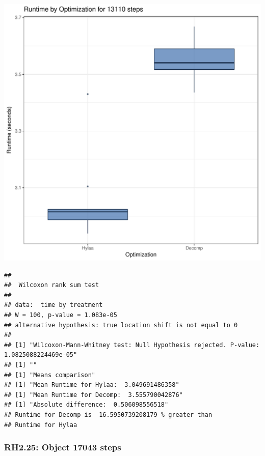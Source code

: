 \documentclass{article}\usepackage[]{graphicx}\usepackage[]{color}
\makeatletter
\def\maxwidth{ %
  \ifdim\Gin@nat@width>\linewidth
    \linewidth
  \else
    \Gin@nat@width
  \fi
}
\newenvironment{kframe}{%
 \def\at@end@of@kframe{}%
 \ifinner\ifhmode%
  \def\at@end@of@kframe{\end{minipage}}%
  \begin{minipage}{\columnwidth}%
 \fi\fi%
 \def\FrameCommand##1{\hskip\@totalleftmargin \hskip-\fboxsep
 \colorbox{shadecolor}{##1}\hskip-\fboxsep
     \hskip-\linewidth \hskip-\@totalleftmargin \hskip\columnwidth}%
 \MakeFramed {\advance\hsize-\width
   \@totalleftmargin\z@ \linewidth\hsize
   \@setminipage}}%
 {\par\unskip\endMakeFramed%
 \at@end@of@kframe}
\newenvironment{knitrout}{}{} %
\makeatother
\begin{document}
\begin{knitrout}
\color{fgcolor}
\includegraphics[width=\maxwidth]{figure/RH2_steps13110-1} 
\begin{kframe}\begin{verbatim}
## 
## 	Wilcoxon rank sum test
## 
## data:  time by treatment
## W = 100, p-value = 1.083e-05
## alternative hypothesis: true location shift is not equal to 0
## 
## [1] "Wilcoxon-Mann-Whitney test: Null Hypothesis rejected. P-value: 1.0825088224469e-05"
## [1] ""
## [1] "Means comparison"
## [1] "Mean Runtime for Hylaa:  3.049691486358"
## [1] "Mean Runtime for Decomp:  3.555790042876"
## [1] "Absolute difference:  0.506098556518"
## Runtime for Decomp is  16.5950739208179 % greater than 
## Runtime for Hylaa
\end{verbatim}
\end{kframe}
\end{knitrout}


\subsubsection{RH2.25: Object 17043 steps}
\end{document}
